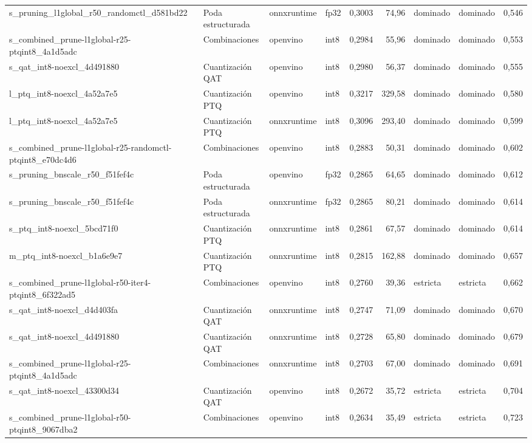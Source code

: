 \begin{landscape}
\begin{table}[htbp]
\begin{adjustbox}{max width=\linewidth, max totalheight=\dimexpr\textheight-\ht\tfmedgetitle-\dp\tfmedgetitle-\ht\tfmedgenotes-\dp\tfmedgenotes-6pt\relax}
\begin{tabular}{llllrrllr}
    s\_pruning\_l1global\_r50\_randomctl\_d581bd22 & Poda estructurada & onnxruntime & fp32 & 0,3003 & 74,96 & dominado & dominado & 0,546 \\
    s\_combined\_prune-l1global-r25-ptqint8\_4a1d5adc & Combinaciones & openvino & int8 & 0,2984 & 55,96 & dominado & dominado & 0,553 \\
    s\_qat\_int8-noexcl\_4d491880 & Cuantización QAT & openvino & int8 & 0,2980 & 56,37 & dominado & dominado & 0,555 \\
    l\_ptq\_int8-noexcl\_4a52a7e5 & Cuantización PTQ & openvino & int8 & 0,3217 & 329,58 & dominado & dominado & 0,580 \\
    l\_ptq\_int8-noexcl\_4a52a7e5 & Cuantización PTQ & onnxruntime & int8 & 0,3096 & 293,40 & dominado & dominado & 0,599 \\
    s\_combined\_prune-l1global-r25-randomctl-ptqint8\_e70dc4d6 & Combinaciones & openvino & int8 & 0,2883 & 50,31 & dominado & dominado & 0,602 \\
    s\_pruning\_bnscale\_r50\_f51fef4c & Poda estructurada & openvino & fp32 & 0,2865 & 64,65 & dominado & dominado & 0,612 \\
    s\_pruning\_bnscale\_r50\_f51fef4c & Poda estructurada & onnxruntime & fp32 & 0,2865 & 80,21 & dominado & dominado & 0,614 \\
    s\_ptq\_int8-noexcl\_5bcd71f0 & Cuantización PTQ & onnxruntime & int8 & 0,2861 & 67,57 & dominado & dominado & 0,614 \\
    m\_ptq\_int8-noexcl\_b1a6e9e7 & Cuantización PTQ & onnxruntime & int8 & 0,2815 & 162,88 & dominado & dominado & 0,657 \\
    s\_combined\_prune-l1global-r50-iter4-ptqint8\_6f322ad5 & Combinaciones & openvino & int8 & 0,2760 & 39,36 & estricta & estricta & 0,662 \\
    s\_qat\_int8-noexcl\_d4d403fa & Cuantización QAT & onnxruntime & int8 & 0,2747 & 71,09 & dominado & dominado & 0,670 \\
    s\_qat\_int8-noexcl\_4d491880 & Cuantización QAT & onnxruntime & int8 & 0,2728 & 65,80 & dominado & dominado & 0,679 \\
    s\_combined\_prune-l1global-r25-ptqint8\_4a1d5adc & Combinaciones & onnxruntime & int8 & 0,2703 & 67,00 & dominado & dominado & 0,691 \\
    s\_qat\_int8-noexcl\_43300d34 & Cuantización QAT & openvino & int8 & 0,2672 & 35,72 & estricta & estricta & 0,704 \\
    s\_combined\_prune-l1global-r50-ptqint8\_9067dba2 & Combinaciones & openvino & int8 & 0,2634 & 35,49 & estricta & estricta & 0,723 \\

\end{tabular}
\end{adjustbox}
\end{table}
\end{landscape}
